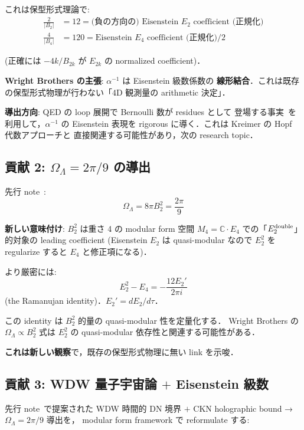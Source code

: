 \documentclass[11pt,a4paper]{article}
\begin{document}
これは保型形式理論で:
\begin{align}
\frac{2}{|B_2|} &= 12 = \text{(負の方向の) Eisenstein $E_2$ coefficient (正規化)}\\
\frac{4}{|B_4|} &= 120 = \text{Eisenstein $E_4$ coefficient (正規化)}/2
\end{align}

(正確には $-4k/B_{2k}$ が $E_{2k}$ の normalized coefficient)．

\textbf{Wright Brothers の主張}: $\alpha^{-1}$ は Eisenstein 級数係数の
\textbf{線形結合}．これは既存の保型形式物理が行わない「4D 観測量の
arithmetic 決定」．

\textbf{導出方向}: QED の loop 展開で Bernoulli 数が residues として
登場する事実~\cite{Kreimer1999}を利用して，$\alpha^{-1}$ の
Eisenstein 表現を rigorous に導く．これは Kreimer の Hopf 代数アプローチと
直接関連する可能性があり，次の research topic．

\subsection{貢献 2: $\Omega_\Lambda = 2\pi/9$ の導出}

先行 note~\cite{wb-wdw}:
\begin{equation}
\Omega_\Lambda = 8\pi B_2^2 = \frac{2\pi}{9}
\end{equation}

\textbf{新しい意味付け}: $B_2^2$ は重さ 4 の modular form 空間
$M_4 = \mathbb{C} \cdot E_4$ での「$E_2^{\rm double}$」的対象の
leading coefficient (Eisenstein $E_2$ は quasi-modular なので
$E_2^2$ を regularize すると $E_4$ と修正項になる)．

より厳密には:
\begin{equation}
E_2^2 - E_4 = -\frac{12 E_2'}{2\pi i}
\end{equation}
(the Ramanujan identity)．$E_2' = dE_2/d\tau$．

この identity は $B_2^2$ 的量の quasi-modular 性を定量化する．
Wright Brothers の $\Omega_\Lambda \propto B_2^2$ 式は
$E_2^2$ の quasi-modular 依存性と関連する可能性がある．

\textbf{これは新しい観察}で，既存の保型形式物理に無い link を示唆．

\subsection{貢献 3: WDW 量子宇宙論 $+$ Eisenstein 級数}

先行 note~\cite{wb-wdw}で提案された WDW 時間的 DN 境界 $+$
CKN holographic bound → $\Omega_\Lambda = 2\pi/9$ 導出を，
modular form framework で reformulate する:
\end{document}
